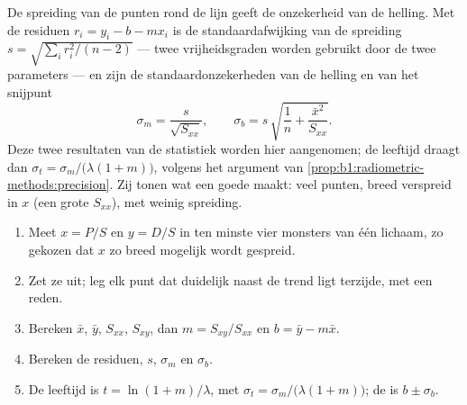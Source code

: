 De spreiding van de punten rond de lijn geeft de onzekerheid van de helling. Met de residuen $r_i = y_i - b - m x_i$ is de standaardafwijking van de spreiding $s = \sqrt{\sum_i r_i^2/(n-2)}$ --- twee vrijheidsgraden worden gebruikt door de twee parameters --- en zijn de standaardonzekerheden van de helling en van het snijpunt
\[
  \sigma_m = \frac{s}{\sqrt{S_{xx}}}, \qquad
  \sigma_b = s\,\sqrt{\frac1n + \frac{\bar x^2}{S_{xx}}} .
\]
Deze twee resultaten van de statistiek worden hier aangenomen; de leeftijd draagt dan $\sigma_t = \sigma_m/\bigl(\lambda(1 + m)\bigr)$, volgens het argument van \cref{prop:b1:radiometric-methods:precision}. Zij tonen wat een goede  maakt: veel punten, breed verspreid in $x$ (een grote $S_{xx}$), met weinig spreiding.

\begin{method}\label{met:b1:radiometric-methods:isochron}
\begin{enumerate}
  \item Meet $x = P/S$ en $y = D/S$ in ten minste vier monsters van één lichaam, zo gekozen dat $x$ zo breed mogelijk wordt gespreid.
  \item Zet ze uit; leg elk punt dat duidelijk naast de trend ligt terzijde, met een reden.
  \item Bereken $\bar x$, $\bar y$, $S_{xx}$, $S_{xy}$, dan $m = S_{xy}/S_{xx}$
        en $b = \bar y - m \bar x$.
  \item Bereken de residuen, $s$, $\sigma_m$ en $\sigma_b$.
  \item De leeftijd is $t = \ln(1+m)/\lambda$, met $\sigma_t =
        \sigma_m/\bigl(\lambda(1+m)\bigr)$; de  is $b \pm \sigma_b$.
\end{enumerate}
\end{method}

